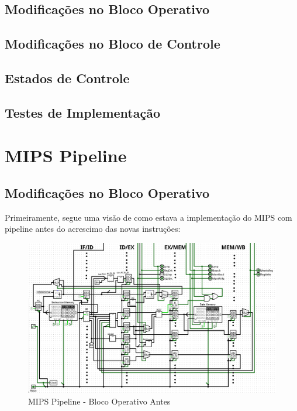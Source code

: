 \documentclass{report}
\let\oldsection\section
\renewcommand\section{\clearpage\oldsection}
\begin{document}
        \subsection{Modificações no Bloco Operativo}
        \subsection{Modificações no Bloco de Controle}
        \subsection{Estados de Controle}
        \subsection{Testes de Implementação}

    \section{MIPS Pipeline}
        \subsection{Modificações no Bloco Operativo}
        Primeiramente, segue uma visão de como estava a implementação do MIPS com pipeline antes
        do acrescimo das novas instruções:
        \begin{figure}[h!]
            \centering
            \includegraphics[width=\linewidth]{images/prints/Pipeline/Bloco Operativo Pipeline Antes.png}
            \caption{\label{print:pipeline_ob_before} MIPS Pipeline - Bloco Operativo Antes}
        \end{figure}
\end{document}
